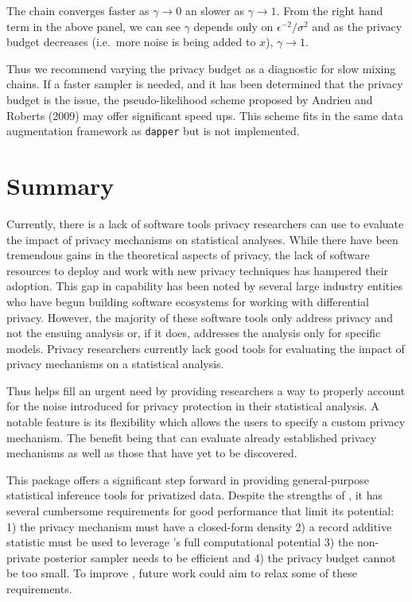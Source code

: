 The chain converges faster as \(\gamma \to 0\) an slower as \(\gamma \to 1\).
From the right hand term in the above panel, we can see \(\gamma\)
depends only on \(\epsilon^{-2}/\sigma^2\) and as the privacy budget decreases (i.e.~more noise is being added to \(x\)),
\(\gamma \to 1\).

Thus we recommend varying the privacy budget as a diagnostic for slow mixing chains.
If a faster sampler is needed, and it has been
determined that the privacy budget is the issue, the pseudo-likelihood scheme proposed by Andrieu and Roberts (2009)
may offer significant speed ups. This scheme fits in the same data augmentation framework as \texttt{dapper} but is not implemented.

\hypertarget{summary}{%
\section{Summary}\label{summary}}

Currently, there is a lack of software tools privacy researchers can use
to evaluate the impact of privacy mechanisms on statistical analyses.
While there have been tremendous gains in the theoretical aspects of privacy,
the lack of software resources to deploy and work with new privacy techniques has
hampered their adoption. This gap in capability has been noted by several
large industry entities who have begun building software ecosystems for
working with differential privacy. However, the majority of these software tools only address privacy and not the
ensuing analysis or, if it does, addresses the analysis only for specific models.
Privacy researchers currently lack good tools for evaluating the impact
of privacy mechanisms on a statistical analysis.

Thus  helps fill an urgent need by providing researchers a way to properly account
for the noise introduced for privacy protection in their statistical analysis. A notable
feature is its flexibility which allows the users to specify a custom
privacy mechanism. The benefit being that  can evaluate already
established privacy mechanisms as well as those that have yet to be discovered.

This package offers a significant step forward in providing general-purpose statistical
inference tools for privatized data. Despite the strengths of , it has
several cumbersome requirements for good performance that limit its potential:
1) the privacy mechanism must have a closed-form density 2) a record additive
statistic must be used to leverage 's full computational potential
3) the non-private posterior sampler needs to be efficient and 4) the privacy budget cannot be too small.
To improve , future work could aim to relax some of these requirements.

